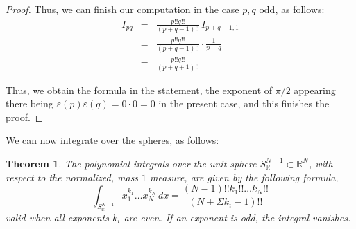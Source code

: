 \documentclass[12pt]{amsbook}
\newtheorem{theorem}{Theorem}[chapter]
\begin{document}
\begin{proof}
Thus, we can finish our computation in the case $p,q$ odd, as follows:
\begin{eqnarray*}
I_{pq}
&=&\frac{p!!q!!}{(p+q-1)!!}\,I_{p+q-1,1}\\
&=&\frac{p!!q!!}{(p+q-1)!!}\cdot\frac{1}{p+q}\\
&=&\frac{p!!q!!}{(p+q+1)!!}
\end{eqnarray*}

Thus, we obtain the formula in the statement, the exponent of $\pi/2$ appearing there being $\varepsilon(p)\varepsilon(q)=0\cdot 0=0$ in the present case, and this finishes the proof.
\end{proof}

We can now integrate over the spheres, as follows:


\begin{theorem}
The polynomial integrals over the unit sphere $S^{N-1}_\mathbb R\subset\mathbb R^N$, with respect to the normalized, mass $1$ measure, are given by the following formula,
$$\int_{S^{N-1}_\mathbb R}x_1^{k_1}\ldots x_N^{k_N}\,dx=\frac{(N-1)!!k_1!!\ldots k_N!!}{(N+\Sigma k_i-1)!!}$$
valid when all exponents $k_i$ are even. If an exponent is odd, the integral vanishes.
\end{theorem}
\end{document}
